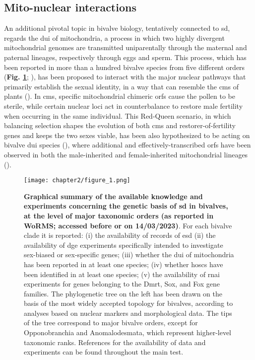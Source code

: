 \subsection{Mito-nuclear interactions}
An additional pivotal topic in bivalve biology, tentatively connected to \gls{sd}, regards the \gls{dui} of mitochondria, a process in which two highly divergent mitochondrial genomes are transmitted uniparentally through the maternal and paternal lineages, respectively through eggs and sperm. This process, which has been reported in more than a hundred bivalve species from five different orders (\textbf{Fig. \ref{fig:summarySex}}; \textbf{\cite{gusman2016pursuing,capt2020unorthodox}}), has been proposed to interact with the major nuclear pathways that primarily establish the sexual identity, in a way that can resemble the \gls{cms} of plants (\textbf{\cite{ghiselli2013structure,breton2022did}}). In \gls{cms}, specific mitochondrial chimeric \glspl{orf} cause the pollen to be sterile, while certain nuclear loci act in counterbalance to restore male fertility when occurring in the same individual. This Red-Queen scenario, in which balancing selection shapes the evolution of both \gls{cms} and restorer-of-fertility genes and keeps the two sexes viable, has been also hypothesized to be acting on bivalve \gls{dui} species (\textbf{\cite{ghiselli2013structure,xu2022lack}}), where additional and effectively-transcribed \glspl{orf} have been observed in both the male-inherited and female-inherited mitochondrial lineages (\textbf{\cite{milani2013nuclear,milani2014paternally}}).

\begin{figure}[t]
	\centering
	\texttt{[image: chapter2/figure\_1.png]}
	\captionsetup{width=\textwidth}
	\caption{
		\textbf{Graphical summary of the available knowledge and experiments concerning the genetic basis of \gls{sd} in bivalves, at the level of major taxonomic orders (as reported in WoRMS; accessed before or on 14/03/2023)}. For each bivalve clade it is reported: (i) the availability of records of \gls{esd} (ii) the availability of \gls{dge} experiments specifically intended to investigate sex-biased or sex-specific genes; (iii) whether the \gls{dui} of mitochondria has been reported in at least one species; (iv) whether \glspl{hosc} have been identified in at least one species; (v) the availability of \gls{rnai} experiments for genes belonging to the Dmrt, Sox, and Fox gene families. The phylogenetic tree on the left has been drawn on the basis of the most widely accepted topology for bivalves, according to analyses based on nuclear markers and morphological data. The tips of the tree correspond to major bivalve orders, except for Opponobranchia and Anomalodesmata, which represent higher-level taxonomic ranks. References for the availability of data and experiments can be found throughout the main test.
	}
	\label{fig:summarySex}
\end{figure}

